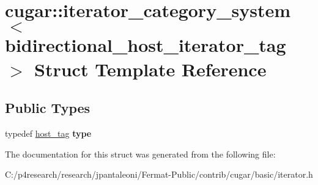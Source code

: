 \hypertarget{structcugar_1_1iterator__category__system_3_01bidirectional__host__iterator__tag_01_4}{}\section{cugar\+:\+:iterator\+\_\+category\+\_\+system$<$ bidirectional\+\_\+host\+\_\+iterator\+\_\+tag $>$ Struct Template Reference}
\label{structcugar_1_1iterator__category__system_3_01bidirectional__host__iterator__tag_01_4}
\subsection*{Public Types}
\begin{DoxyCompactItemize}
\item 
\mbox{\label{structcugar_1_1iterator__category__system_3_01bidirectional__host__iterator__tag_01_4_a17b3b98b100e24632cf5413edb3e9e5c}} 
typedef \hyperlink{structcugar_1_1host__tag}{host\+\_\+tag} {\bfseries type}
\end{DoxyCompactItemize}


The documentation for this struct was generated from the following file\+:\begin{DoxyCompactItemize}
\item 
C\+:/p4research/research/jpantaleoni/\+Fermat-\/\+Public/contrib/cugar/basic/iterator.\+h\end{DoxyCompactItemize}
